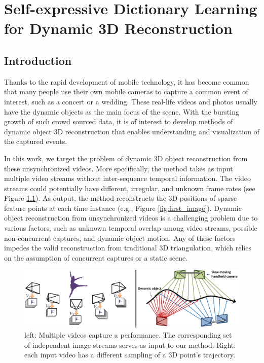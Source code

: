 \chapter{Self-expressive Dictionary Learning for Dynamic 3D Reconstruction} \label{ch:video_l1}

\section{Introduction}

Thanks to the rapid development of mobile technology, it has become common that many people use their own mobile cameras to capture a common event of interest, such as a concert or a wedding. These real-life videos and photos usually have the dynamic objects as the main focus of the scene. With the bursting growth of such crowd sourced data, it is of interest to develop methods of dynamic object 3D reconstruction that enables understanding and visualization of the captured events.

In this work, we target the problem of dynamic 3D object reconstruction from these unsynchronized videos. 
More specifically, the method takes as input multiple video streams without inter-sequence temporal information. The video streams could potentially have different, irregular, and unknown frame rates (see Figure \ref{fig:overview}). 
As output, the method reconstructs the 3D positions of sparse feature points at each time instance (e.g., Figure \ref{fig:first_image}). 
Dynamic object reconstruction from unsynchronized videos is a challenging problem due to various factors, such as unknown temporal overlap among video streams, possible non-concurrent captures, and dynamic object motion. Any of these factors impedes the valid reconstruction from traditional 3D triangulation, which relies on the assumption of concurrent captures or a static scene.


\begin{figure}
\centering
\includegraphics[width=1\textwidth]{chapter5/resource/overview_1_cropped.pdf}
\caption[Illustration of the input for sparse reconstruction from unsynchronized videos.]{\label{fig:overview} left: Multiple videos capture a performance.
The corresponding set of independent image streams  serves as input to our method.
Right: each input video has a different sampling of a 3D point's trajectory.}
\end{figure}


